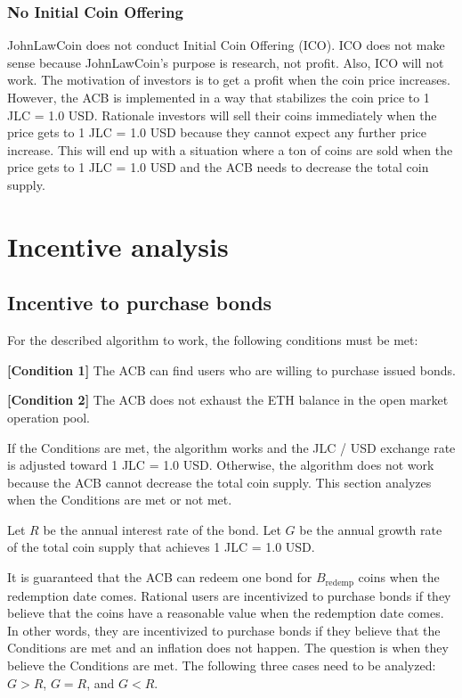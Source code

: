 \documentclass[dvipdfmx,a4paper]{article}
\begin{document}
\subsubsection{No Initial Coin Offering}

JohnLawCoin does not conduct Initial Coin Offering (ICO). ICO does not make sense because JohnLawCoin's purpose is research, not profit. Also, ICO will not work. The motivation of investors is to get a profit when the coin price increases. However, the ACB is implemented in a way that stabilizes the coin price to 1 JLC = 1.0 USD. Rationale investors will sell their coins immediately when the price gets to 1 JLC = 1.0 USD because they cannot expect any further price increase. This will end up with a situation where a ton of coins are sold when the price gets to 1 JLC = 1.0 USD and the ACB needs to decrease the total coin supply.

\section{Incentive analysis}

\subsection{Incentive to purchase bonds}

For the described algorithm to work, the following conditions must be met:

\begin{description}
\item{\textbf{[Condition 1]}} The ACB can find users who are willing to purchase issued bonds.
\item{\textbf{[Condition 2]}} The ACB does not exhaust the ETH balance in the open market operation pool.
\end{description}

If the Conditions are met, the algorithm works and the JLC / USD exchange rate is adjusted toward 1 JLC = 1.0 USD. Otherwise, the algorithm does not work because the ACB cannot decrease the total coin supply. This section analyzes when the Conditions are met or not met.

Let $R$ be the annual interest rate of the bond. Let $G$ be the annual growth rate of the total coin supply that achieves 1 JLC = 1.0 USD.

It is guaranteed that the ACB can redeem one bond for $B_{\mathrm{redemp}}$ coins when the redemption date comes. Rational users are incentivized to purchase bonds if they believe that the coins have a reasonable value when the redemption date comes. In other words, they are incentivized to purchase bonds if they believe that the Conditions are met and an inflation does not happen. The question is when they believe the Conditions are met. The following three cases need to be analyzed: $G>R$, $G=R$, and $G<R$.
\end{document}
